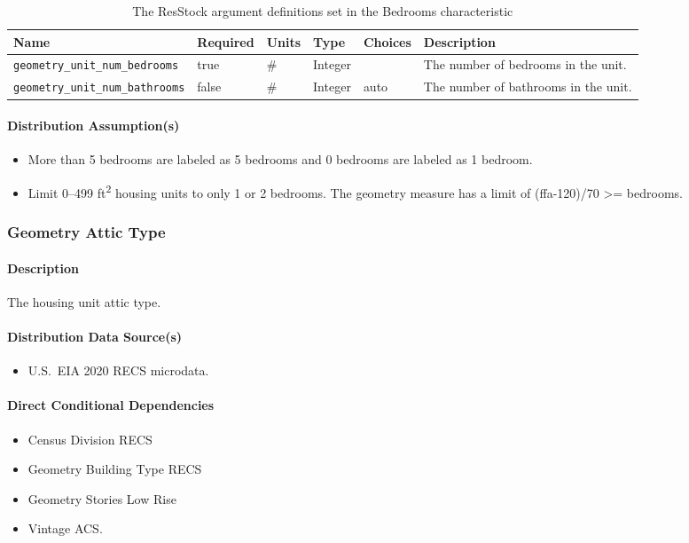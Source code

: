 \begin{longtable}[]{ |p{}|p{1.5cm}|p{1cm}|p{1.1cm}|p{1.4cm}|p{6cm}| }
\caption{The ResStock argument definitions set in the Bedrooms characteristic} \label{table:hc_arg_def_bed} \\
\toprule\noalign{}
Name & Required & Units & Type & Choices & Description \\
\midrule\noalign{}
\endhead
\bottomrule\noalign{}
\endlastfoot
\texttt{geometry\_unit\_num\_bedrooms} & true & \# & Integer & & The
number of bedrooms in the unit. \\
\hline
\texttt{geometry\_unit\_num\_bathrooms} & false & \# & Integer & auto &
The number of bathrooms in the unit.  \\
\end{longtable}

\paragraph{Distribution Assumption(s)}
\begin{itemize}
    \item More than 5 bedrooms are labeled as 5 bedrooms and 0 bedrooms are labeled as 1 bedroom.
    \item Limit 0--499 ft\textsuperscript{2} housing units to only 1 or 2 bedrooms. The geometry measure has a limit of (ffa-120)/70 >= bedrooms.
\end{itemize}

\subsubsection{Geometry Attic Type}
\paragraph{Description}
The housing unit attic type.

\paragraph{Distribution Data Source(s)}
\begin{itemize}
    \item U.S.~EIA 2020 RECS microdata.
\end{itemize}

\paragraph{Direct Conditional Dependencies}
\begin{itemize}
    \item Census Division RECS
    \item Geometry Building Type RECS
    \item Geometry Stories Low Rise
    \item Vintage ACS.
\end{itemize}

